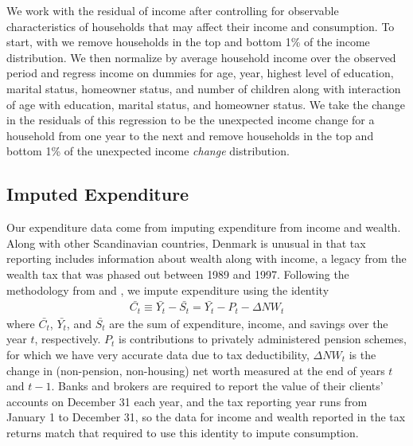 \documentclass[titlepage]{\econtex}\newcommand{\texname}{ConsumptionHeterogeneity}
\begin{document}
We work with the residual of income after controlling for observable characteristics of households that may affect their income and consumption. To start, with we remove households in the top and bottom 1\% of the income distribution. We then normalize by average household income over the observed period and regress income on dummies for age, year, highest level of education, marital status, homeowner status, and number of children along with interaction of age with education, marital status, and homeowner status. We take the change in the residuals of this regression to be the unexpected income change for a household from one year to the next and remove households in the top and bottom 1\% of the unexpected income \textit{change} distribution.

\subsection{Imputed Expenditure} \label{cons_imputation}
Our expenditure data come from imputing expenditure from income and wealth. Along with other Scandinavian countries, Denmark is unusual in that tax reporting includes information about wealth along with income, a legacy from the wealth tax that was phased out between 1989 and 1997. Following the methodology from \cite{browning_imputing_2003} and \cite{fagereng_imputing_2015}, we impute expenditure using the identity
\begin{align*}
\bar{C_t} \equiv \bar{Y_t} - \bar{S_t} = \bar{Y_t} - P_t - \Delta NW_t 
\end{align*}
where $\bar{C_t}$, $\bar{Y_t}$, and $\bar{S_t}$  are the sum of expenditure, income, and savings over the year $t$, respectively. $P_t$ is contributions to privately administered pension schemes, for which we have very accurate data due to tax deductibility, $\Delta NW_t$ is the change in (non-pension, non-housing) net worth measured at the end of years $t$ and $t-1$. Banks and brokers are required to report the value of their clients' accounts on December 31 each year, and the tax reporting year runs from January 1 to December 31, so the data for income and wealth reported in the tax returns match that required to use this identity to impute consumption. 
\end{document}
